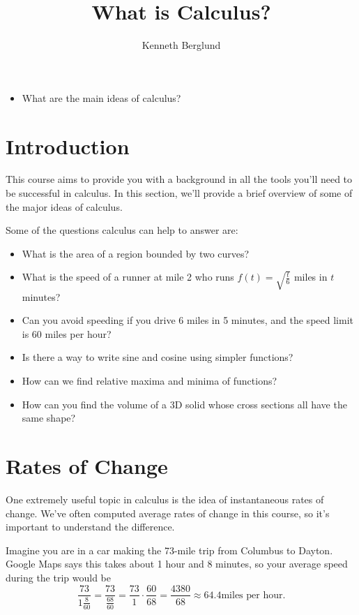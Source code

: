 \documentclass{ximera}
\author{Kenneth Berglund}
\title{What is Calculus?}
\begin{document}
\begin{abstract}
\end{abstract}
\maketitle
%
%
%
\begin{motivatingQuestions}\begin{itemize}
\item What are the main ideas of calculus?
\end{itemize}\end{motivatingQuestions}
%
%
%
\section{Introduction}
%
This course aims to provide you with a background in all the tools you'll need to be successful in calculus. In this section, we'll provide a brief overview of some of the major ideas of calculus. 

Some of the questions calculus can help to answer are:
\begin{itemize}
\item What is the area of a region bounded by two curves?
\item What is the speed of a runner at mile 2 who runs $f(t) = \sqrt{\frac{t}{6}}$ miles in $t$ minutes? 
\item Can you avoid speeding if you drive 6 miles in 5 minutes, and the speed limit is 60 miles per hour?
\item Is there a way to write sine and cosine using simpler functions?
\item How can we find relative maxima and minima of functions?
\item How can you find the volume of a 3D solid whose cross sections all have the same shape?
\end{itemize}


\section{Rates of Change}
One extremely useful topic in calculus is the idea of instantaneous rates of change. We've often computed average rates of change in this course, so it's important to understand the difference.

Imagine you are in a car making the 73-mile trip from Columbus to Dayton. Google Maps says this takes about 1 hour and 8 minutes, so your average speed during the trip would be 
$$
\frac{73}{1\frac{8}{60}} = \frac{73}{\frac{68}{60}} = \frac{73}{1} \cdot \frac{60}{68} = \frac{4380}{68} \approx 64.4 \text{miles per hour}.
$$
\end{document}
